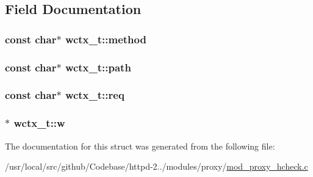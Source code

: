\subsection{Field Documentation}
\subsubsection[{\texorpdfstring{method}{method}}]{\setlength{\rightskip}{0pt plus 5cm}const char$\ast$ wctx\+\_\+t\+::method}\hypertarget{structwctx__t_a2b4042362c17c82892fa03bd23c4780d}{}\label{structwctx__t_a2b4042362c17c82892fa03bd23c4780d}
\subsubsection[{\texorpdfstring{path}{path}}]{\setlength{\rightskip}{0pt plus 5cm}const char$\ast$ wctx\+\_\+t\+::path}\hypertarget{structwctx__t_a1d2c2b4236f67468dd07599efff0a1d3}{}\label{structwctx__t_a1d2c2b4236f67468dd07599efff0a1d3}
\subsubsection[{\texorpdfstring{req}{req}}]{\setlength{\rightskip}{0pt plus 5cm}const char$\ast$ wctx\+\_\+t\+::req}\hypertarget{structwctx__t_ac991b4b9cbd27ff5d872121a096761f9}{}\label{structwctx__t_ac991b4b9cbd27ff5d872121a096761f9}
\subsubsection[{\texorpdfstring{w}{w}}]{$\ast$ wctx\+\_\+t\+::w}\hypertarget{structwctx__t_ae0bb78abcbcb81a638d1f94aaa63adc4}{}\label{structwctx__t_ae0bb78abcbcb81a638d1f94aaa63adc4}


The documentation for this struct was generated from the following file\+:\begin{DoxyCompactItemize}
\item 
/usr/local/src/github/\+Codebase/httpd-\/2../modules/proxy/\hyperlink{mod__proxy__hcheck_8c}{mod\+\_\+proxy\+\_\+hcheck.\+c}\end{DoxyCompactItemize}
